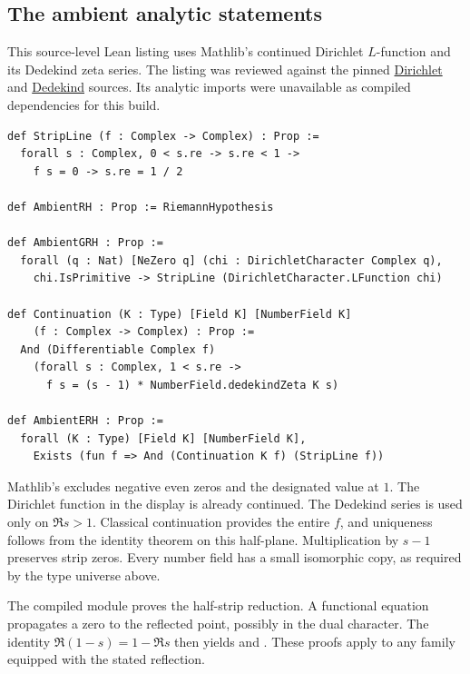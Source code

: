 \subsection*{The ambient analytic statements}
This source-level Lean listing uses Mathlib's continued Dirichlet $L$-function and its Dedekind zeta series. The listing was reviewed against the pinned \href{https://github.com/leanprover-community/mathlib4/blob/81a5d257c8e410db227a6665ed08f64fea08e997/Mathlib/NumberTheory/LSeries/DirichletContinuation.lean}{Dirichlet} and \href{https://github.com/leanprover-community/mathlib4/blob/81a5d257c8e410db227a6665ed08f64fea08e997/Mathlib/NumberTheory/NumberField/DedekindZeta.lean}{Dedekind} sources. Its analytic imports were unavailable as compiled dependencies for this build.
{\footnotesize\begin{verbatim}
def StripLine (f : Complex -> Complex) : Prop :=
  forall s : Complex, 0 < s.re -> s.re < 1 ->
    f s = 0 -> s.re = 1 / 2

def AmbientRH : Prop := RiemannHypothesis

def AmbientGRH : Prop :=
  forall (q : Nat) [NeZero q] (chi : DirichletCharacter Complex q),
    chi.IsPrimitive -> StripLine (DirichletCharacter.LFunction chi)

def Continuation (K : Type) [Field K] [NumberField K]
    (f : Complex -> Complex) : Prop :=
  And (Differentiable Complex f)
    (forall s : Complex, 1 < s.re ->
      f s = (s - 1) * NumberField.dedekindZeta K s)

def AmbientERH : Prop :=
  forall (K : Type) [Field K] [NumberField K],
    Exists (fun f => And (Continuation K f) (StripLine f))
\end{verbatim}}
Mathlib's  excludes negative even zeros and the designated value at $1$. The Dirichlet function in the display is already continued. The Dedekind series is used only on $\Re s>1$. Classical continuation provides the entire $f$, and uniqueness follows from the identity theorem on this half-plane. Multiplication by $s-1$ preserves strip zeros. Every number field has a small isomorphic copy, as required by the type universe above.

The compiled module  proves the half-strip reduction. A functional equation propagates a zero to the reflected point, possibly in the dual character. The identity $\Re(1-s)=1-\Re s$ then yields  and . These proofs apply to any family equipped with the stated reflection.
